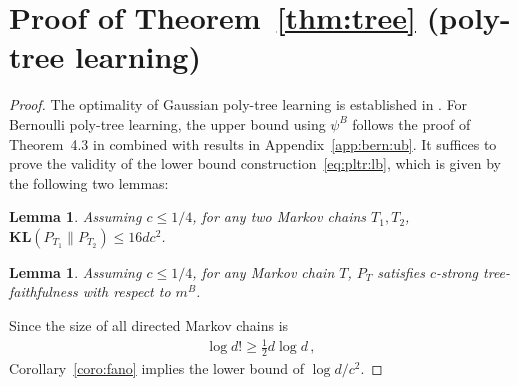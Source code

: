 \documentclass{article}
\newtheorem{lemma}[theorem]{Lemma}
\theoremstyle{definition}
\theoremstyle{definition}
\theoremstyle{definition}
\theoremstyle{definition}
\theoremstyle{definition}
\theoremstyle{definition}
\theoremstyle{remark}
\theoremstyle{remark}
\newcommand{\dpdm}{m}
\newcommand{\dd}{d}
\begin{document}
\section{Proof of Theorem~\ref{thm:tree} (poly-tree learning)}\label{app:tree}
\begin{proof}
The optimality of Gaussian poly-tree learning is established in \citet{wang2024optimal}. 
For Bernoulli poly-tree learning, the upper bound using $\psi^B$ follows the proof of Theorem~4.3 in \citet{wang2024optimal} combined with results in Appendix~\ref{app:bern:ub}. It suffices to prove the validity of the lower bound construction~\eqref{eq:pltr:lb}, which is given by the following two lemmas:
\begin{lemma}\label{lem:bern:lb:kl}
     Assuming $c\le 1/4$, for any two Markov chains $T_1,T_2$, $\mathbf{KL}(P_{T_1}\| P_{T_2}) \le 16 \dd c^2$.
\end{lemma}
\begin{lemma}\label{lem:bern:lb:faith}
    Assuming $c\le 1/4$, for any Markov chain $T$, $P_T$ satisfies $c$-strong tree-faithfulness with respect to $\dpdm^B$.
\end{lemma}
\noindent
Since the size of all directed Markov chains is 
\begin{align*}
    \log \dd! \ge \frac{1}{2}\dd\log \dd\,,
\end{align*}
Corollary~\ref{coro:fano} implies the lower bound of $\log\dd / c^2$.
\end{proof}
\end{document}

